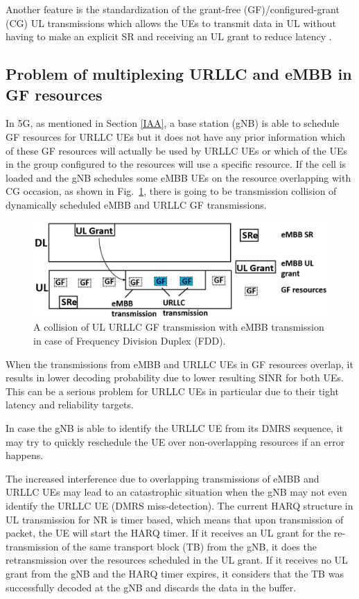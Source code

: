 \documentclass[conference]{IEEEtran}
\begin{document}
Another feature is the standardization of the grant-free (GF)/configured-grant (CG) UL transmissions which allows the UEs to transmit data in UL without having to make an explicit SR and receiving an UL grant to reduce latency \cite{ad4}.

\subsection{Problem of multiplexing URLLC and eMBB in GF resources}\label{IBB}
In 5G, as mentioned in Section \ref{IAA}, a base station (gNB) is able to schedule GF resources for URLLC UEs but it does not have any prior information which of these GF resources will actually be used by URLLC UEs or which of the UEs in the group configured to the resources will use a specific resource. If the cell is loaded and the gNB schedules some eMBB UEs on the resource overlapping with CG occasion, as shown in Fig.~\ref{fig1}, there is going to be transmission collision of dynamically scheduled eMBB and URLLC GF transmissions. 

\begin{figure}[htbp]
\centerline{\includegraphics[scale=0.25]{fig1.PNG}}
\caption{A collision of UL URLLC GF transmission with eMBB transmission in case of Frequency Division Duplex (FDD).}
\label{fig1}
\vspace{-3mm}
\end{figure}

When the transmissions from eMBB and URLLC UEs in GF resources overlap, it results in lower decoding probability due to lower resulting SINR for both UEs. This can be a serious problem for URLLC UEs in particular due to their tight latency and reliability targets.

In case the gNB is able to identify the URLLC UE from its DMRS sequence, it may try to quickly reschedule the UE over non-overlapping resources if an error happens.

The increased interference due to overlapping transmissions of eMBB and URLLC UEs may lead to an catastrophic situation when the gNB may not even identify the URLLC UE (DMRS miss-detection). The current HARQ structure in UL transmission for NR is timer based, which means that upon transmission of packet, the UE will start the HARQ timer. If it receives an UL grant for the re-transmission of the same transport block (TB) from the gNB, it does the retransmission over the resources scheduled in the UL grant. If it receives no UL grant from the gNB and the HARQ timer expires, it considers that the TB was successfully decoded at the gNB and discards the data in the buffer. 
\end{document}
